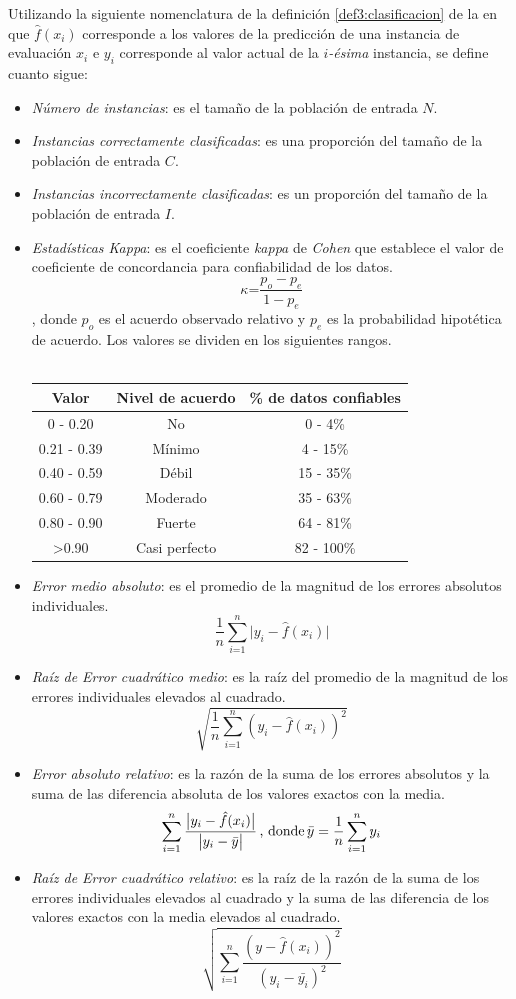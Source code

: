 Utilizando la siguiente nomenclatura de la definición \ref{def3:clasificacion}
de la  en que $\hat{f}(x_{i})$ corresponde
a los valores de la predicción de una instancia de evaluación $x_{i}$
e $y_{i}$ corresponde al valor actual de la \emph{$i$-ésima} instancia,
se define cuanto sigue:
\begin{itemize}
\item \emph{Número de instancias}: es el tamaño de la población de entrada
$N$.
\item \emph{Instancias correctamente clasificadas}: es una proporción del
tamaño de la población de entrada $C$.
\item \emph{Instancias incorrectamente clasificadas}: es un proporción del
tamaño de la población de entrada $I$.
\item \emph{Estadísticas Kappa}: es el coeficiente \emph{kappa} de \emph{Cohen}
que establece el valor de coeficiente de concordancia para confiabilidad
de los datos. 
\[
\kappa\text{=}\frac{p_{o}-p_{e}}{1-p_{e}}
\]
, donde $p_{o}$ es el acuerdo observado relativo y $p_{e}$ es la
probabilidad hipotética de acuerdo. Los valores se dividen en los
siguientes rangos.\\
\\
\begin{tabular}{|c|c|c|}
\hline 
Valor & Nivel de acuerdo & \% de datos confiables\tabularnewline
\hline 
\hline 
0 - 0.20 & No & 0 - 4\%\tabularnewline
\hline 
0.21 - 0.39 & Mínimo & 4 - 15\%\tabularnewline
\hline 
0.40 - 0.59 & Débil & 15 - 35\%\tabularnewline
\hline 
0.60 - 0.79 & Moderado & 35 - 63\%\tabularnewline
\hline 
0.80 - 0.90 & Fuerte & 64 - 81\%\tabularnewline
\hline 
>0.90 & Casi perfecto & 82 - 100\%\tabularnewline
\hline 
\end{tabular}
\item \emph{Error medio absoluto}: es el promedio de la magnitud de los
errores absolutos individuales.
\[
\frac{1}{n}\sum_{i\text{=1}}^{n}\bigl|y_{i}-\hat{f}(x_{i})\bigr|
\]
\item \emph{Raíz de Error cuadrático medio}: es la raíz del promedio de
la magnitud de los errores individuales elevados al cuadrado.
\[
\sqrt{\frac{1}{n}\sum_{i\text{=1}}^{n}\left(y_{i}-\hat{f}(x_{i})\right)^{2}}
\]
\item \emph{Error absoluto relativo}: es la razón de la suma de los errores
absolutos y la suma de las diferencia absoluta de los valores exactos
con la media. 
\[
\sum_{i\text{=1}}^{n}\frac{\bigl|y_{i}-\hat{f}(x_{i})\bigr|}{\bigl|y_{i}-\bar{y}\bigr|}\,\textrm{, donde\,}\bar{y}=\frac{1}{n}\sum_{i=1}^{n}y_{i}
\]
\item \emph{Raíz de Error cuadrático relativo}: es la raíz de la razón de
la suma de los errores individuales elevados al cuadrado y la suma
de las diferencia de los valores exactos con la media elevados al
cuadrado. 
\[
\sqrt{\sum_{i\text{=1}}^{n}\frac{\left(y-\hat{f}(x_{i})\right)^{2}}{\left(y_{i}-\bar{y_{i}}\right)^{2}}}
\]
\end{itemize}

